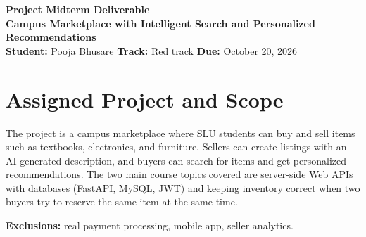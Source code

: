 \documentclass[11pt]{article}
\begin{document}
\vspace*{-1.2em}
\begin{center}
  {\large\bfseries Project Midterm Deliverable}\\[0.2em]
  {\Large\bfseries Campus Marketplace with Intelligent Search and Personalized Recommendations}\\[0.3em]
  \textbf{Student:} Pooja Bhusare \quad
  \textbf{Track:} Red track \quad
  \textbf{Due:} October 20, 2026
\end{center}

\section{Assigned Project and Scope}
The project is a campus marketplace where SLU students can buy and sell items such as textbooks,
electronics, and furniture. Sellers can create listings with an AI-generated description, and buyers
can search for items and get personalized recommendations. The two main course topics covered
are server-side Web APIs with databases (FastAPI, MySQL, JWT) and keeping inventory correct
when two buyers try to reserve the same item at the same time.

\textbf{Exclusions:} real payment processing, mobile app, seller analytics.
\end{document}
